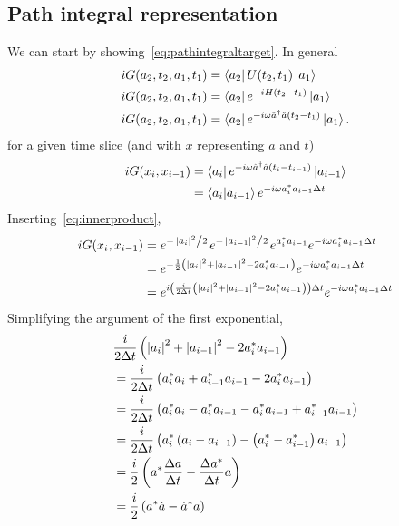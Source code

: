 \documentclass{article}
\begin{document}
	\subsection{Path integral representation} \label{subsec:pathintegralrep}
	We can start by showing~\eqref{eq:pathintegraltarget}.
	In general
	\begin{align}
		i G(a_2, t_2, a_1, t_1) &= \bra{a_2} U(t_2, t_1) \ket{a_1} \\
		i G(a_2, t_2, a_1, t_1) &= \bra{a_2} e^{-i H (t_2 - t_1)} \ket{a_1} \\
		i G(a_2, t_2, a_1, t_1) &= \bra{a_2} e^{-i \omega \hat{a}^\dagger \hat{a} (t_2 - t_1)} \ket{a_1}.
	\end{align}
	\triv for a given time slice (and with $x$ representing $a$ and $t$)
	\begin{align}
		i G(x_i, x_{i-1}) &= \bra{a_i} e^{-i \omega \hat{a}^\dagger \hat{a} (t_i - t_{i-1})} \ket{a_{i-1}} \\
		&= \bra{a_i} \ket{a_{i-1}}  e^{-i \omega a_i^\ast a_{i-1} \Delta t}
	\end{align}
	Inserting~\eqref{eq:innerproduct},
	\begin{align}
		i G(x_i, x_{i-1}) &= e^{-\flatfrac{\abs{a_i}^2}{2}} e^{-\flatfrac{\abs{a_{i-1}}^2}{2}} e^{a_i^\ast a_{i-1}} e^{-i \omega a_i^\ast a_{i-1} \Delta t} \\
		&= e^{-\frac{1}{2} \left( \abs{a_i}^2 + \abs{a_{i-1}}^2 - 2 a_i^\ast a_{i-1}\right)} e^{-i \omega a_i^\ast a_{i-1} \Delta t} \\
		&= e^{i \left(\frac{i}{2 \Delta t} \left( \abs{a_i}^2 + \abs{a_{i-1}}^2 - 2 a_i^\ast a_{i-1}\right)\right) \Delta t}  e^{-i \omega a_i^\ast a_{i-1} \Delta t} \label{eq:fullexponential}
	\end{align}
	Simplifying the argument of the first exponential,
	\begin{align}
		& \frac{i}{2 \Delta t} \left( \abs{a_i}^2 + \abs{a_{i-1}}^2 - 2 a_i^\ast a_{i-1}\right)\\
		&= \frac{i}{2 \Delta t} \left( a_i^\ast a_i + a_{i-1}^\ast a_{i-1} - 2 a_i^\ast a_{i-1}\right)\\
		&= \frac{i}{2 \Delta t} \left( a_i^\ast a_i - a_i^\ast a_{i-1} - a_i^\ast a_{i-1}+ a_{i-1}^\ast a_{i-1}\right)\\
		&= \frac{i}{2 \Delta t} \left( a_i^\ast \left(a_i -  a_{i-1}\right) - \left(a_i^\ast - a_{i-1}^\ast \right)a_{i-1}\right)\\
		&= \frac{i}{2} \left( a^\ast \frac{\Delta a}{\Delta t} - \frac{\Delta a^\ast}{\Delta t} a \right) \\
		&= \frac{i}{2} \left( a^\ast \dot{a} -  \dot{a}^\ast  a \right)
	\end{align}
\end{document}
